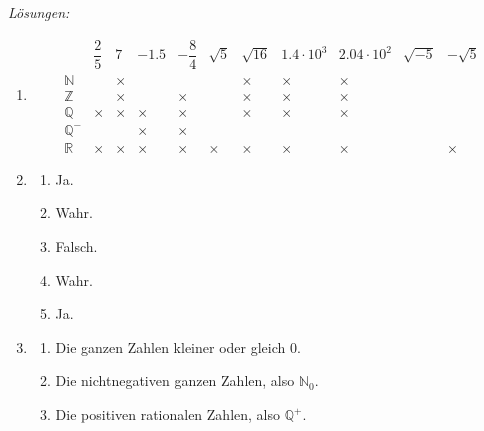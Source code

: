 \emph{Lösungen:}

\begin{enumerate}
    \item
          \[
              \begin{array}{c|c|c|c|c|c|c|c|c|c|c}
                               & \dfrac{2}{5}   & 7               & -1.5      & -\dfrac{8}{4} & \sqrt{5} & \sqrt{16}
                               & 1.4 \cdot 10^3 & 2.04 \cdot 10^2 & \sqrt{-5} & -\sqrt{5}                            \\ \hline
                  \mathbb{N}   &                & \times          &           &               &          & \times
                               & \times         & \times          &           &                                      \\ \hline
                  \mathbb{Z}   &                & \times          &           & \times        &          & \times
                               & \times         & \times          &           &                                      \\ \hline
                  \mathbb{Q}   & \times         & \times          & \times    & \times        &          & \times
                               & \times         & \times          &           &                                      \\ \hline
                  \mathbb{Q}^- &                &                 & \times    & \times        &          &
                               &                &                 &           &                                      \\ \hline
                  \mathbb{R}   & \times         & \times          & \times    & \times        & \times   & \times
                               & \times         & \times          &           & \times
              \end{array}
          \]

    \item
          \begin{enumerate}
              \item Ja.
              \item Wahr.
              \item Falsch.
              \item Wahr.
              \item Ja.
          \end{enumerate}

    \item
          \begin{enumerate}
              \item Die ganzen Zahlen kleiner oder gleich \(0\).
              \item Die nichtnegativen ganzen Zahlen, also \(\mathbb{N}_0\).
              \item Die positiven rationalen Zahlen, also \(\mathbb{Q}^+\).
          \end{enumerate}


\end{enumerate}
